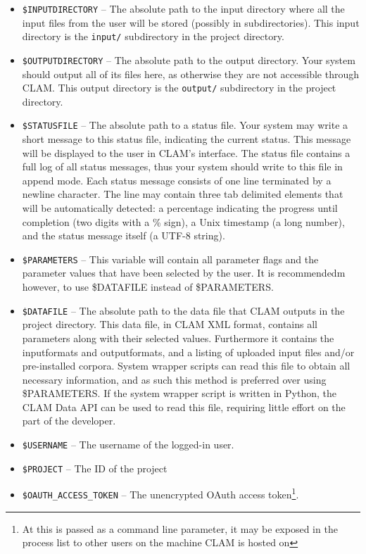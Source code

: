 \documentclass[a4paper,12pt,twoside,openright]{report}
\begin{document}
\begin{itemize}
\item \texttt{\$INPUTDIRECTORY} -- The absolute path to the input directory where all the input files from the user will be stored (possibly in subdirectories). This input directory is the \texttt{input/} subdirectory in the project directory.
\item \texttt{\$OUTPUTDIRECTORY} -- The absolute path to the output directory. Your system should output all of its files here, as otherwise they are not accessible through CLAM.  This output directory is the \texttt{output/} subdirectory in the project directory.
\item \texttt{\$STATUSFILE} -- The absolute path to a status file. Your system may write a short message to this status file, indicating the current status. This message will be displayed to the user in CLAM's interface. The status file contains a full log of all status messages, thus your system should write to this file in append mode. Each status message consists of one line terminated by a newline character. The line may contain three tab delimited elements that will be automatically detected: a percentage indicating the progress until completion (two digits with a \% sign), a Unix timestamp (a long number), and the status message itself (a UTF-8 string).
\item \texttt{\$PARAMETERS} -- This variable will contain all parameter flags
  and the parameter values that have been selected by the user. It is
  recommendedm however, to use \$DATAFILE instead of \$PARAMETERS.
\item \texttt{\$DATAFILE} -- The absolute path to the data file that CLAM outputs in the project directory. This data file, in CLAM XML format, contains all parameters along with their selected values. Furthermore it contains the inputformats and outputformats, and a listing of uploaded input files and/or pre-installed corpora. System wrapper scripts can read this file to obtain all necessary information, and as such this method is preferred over using \$PARAMETERS. If the system wrapper script is written in Python, the CLAM Data API can be used to read this file, requiring little effort on the part of the developer. 
\item \texttt{\$USERNAME} -- The username of the logged-in user.
\item \texttt{\$PROJECT} -- The ID of the project
\item \texttt{\$OAUTH\_ACCESS\_TOKEN} -- The unencrypted OAuth access token\footnote{At this is passed as a command line parameter, it may be exposed in the process list to other users on the machine CLAM is hosted on}.
\end{itemize}
\end{document}
